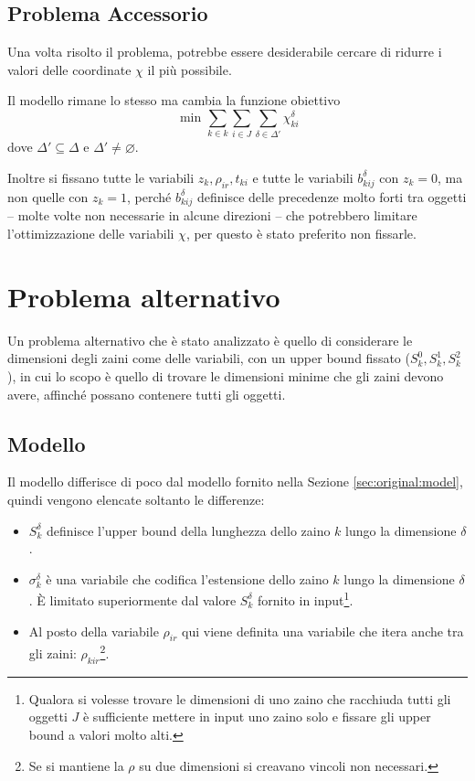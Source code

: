 \documentclass{scrartcl}
\begin{document}
\subsection{Problema Accessorio}
\label{sec:orig:problemaAcessorio}
Una volta risolto il problema, potrebbe essere desiderabile cercare di ridurre i valori delle coordinate
$\chi$ il più possibile.

Il modello rimane lo stesso ma cambia la funzione obiettivo
\begin{equation}
\text{ min } \sum_{k\in k}\sum_{i \in J}\sum_{\delta \in \Delta'} \chi_{ki}^\delta
\end{equation}
dove $\Delta' \subseteq \Delta$ e $\Delta' \neq \varnothing$.

Inoltre si fissano tutte le variabili $z_k, \rho_{ir}, t_{ki}$ e tutte le variabili $b_{kij}^\delta$ con $z_k = 0$, ma non quelle con $z_k = 1$, perché $b_{kij}^\delta$ definisce delle precedenze molto forti tra oggetti -- molte volte non necessarie in alcune direzioni -- che potrebbero limitare l'ottimizzazione delle variabili $\chi$, per questo è stato preferito non fissarle.


\section{Problema alternativo}
\label{sec:extension2}
Un problema alternativo che è  stato analizzato è quello di considerare le dimensioni degli zaini come delle variabili, con un upper bound fissato ($S_k^0, S_k^1, S_k^2$), in cui lo scopo è quello di trovare le dimensioni minime che gli zaini devono avere, affinché possano contenere tutti gli oggetti.

\subsection{Modello}
Il modello differisce di poco dal modello fornito nella
Sezione \ref{sec:original:model}, quindi vengono elencate soltanto le differenze:
\begin{itemize}
	\item $S_k^\delta$ definisce l'upper bound della lunghezza dello zaino $k$ lungo la dimensione $\delta$.
	
	\item $\sigma_k^\delta$ è una variabile che codifica l'estensione dello zaino $k$ lungo la dimensione $\delta$. È limitato superiormente dal valore $S_k^\delta$ fornito in input\footnote{Qualora si volesse trovare le dimensioni di uno zaino che racchiuda tutti gli oggetti $J$ è sufficiente
	mettere in input uno zaino solo e fissare gli upper bound a valori molto alti.}. 
	
	\item Al posto della variabile $\rho_{ir}$ qui viene definita una variabile che itera anche tra gli zaini:
	$\rho_{kir}$\footnote{Se si mantiene la $\rho$ su due dimensioni si creavano vincoli non necessari.}.
\end{itemize}
\end{document}
